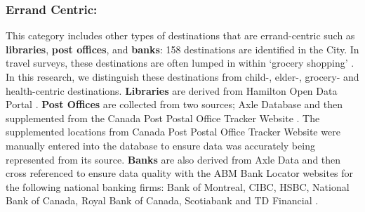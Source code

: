 \documentclass[
  super,
  preprint,
  3p]{elsarticle}
\begin{document}
\hypertarget{errand-centric}{%
\subsubsection{Errand Centric:}\label{errand-centric}}

This category includes other types of destinations that are
errand-centric such as \textbf{libraries}, \textbf{post offices}, and
\textbf{banks}: 158 destinations are identified in the City. In travel
surveys, these destinations are often lumped in within `grocery
shopping' \citep{taylorWhatExplainsGender2015}. In this research, we
distinguish these destinations from child-, elder-, grocery- and
health-centric destinations. \textbf{Libraries} are derived from
Hamilton Open Data Portal \citep{opendatahamiltonLibraries2022}.
\textbf{Post Offices} are collected from two sources; Axle Database and
then supplemented from the Canada Post Postal Office Tracker Website
\citep{axledataConsumerData2023, canadapostPostOfficeLocator2023}. The
supplemented locations from Canada Post Postal Office Tracker Website
were manually entered into the database to ensure data was accurately
being represented from its source. \textbf{Banks} are also derived from
Axle Data and then cross referenced to ensure data quality with the ABM
Bank Locator websites for the following national banking firms: Bank of
Montreal, CIBC, HSBC, National Bank of Canada, Royal Bank of Canada,
Scotiabank and TD Financial
\citep{bankofmontrealBankMontrealBranch2023, thehongkongandshanghaibankingcorporationlimitedhsbcHSBCBranchABM2023, nationalbankNationalBankBranches2023, royalbankofcanadaRBCBranchABM2023, scotiabankScotiabankABMBranch2023, thetorontodominionbankTDBankBranch2023}.
\end{document}
